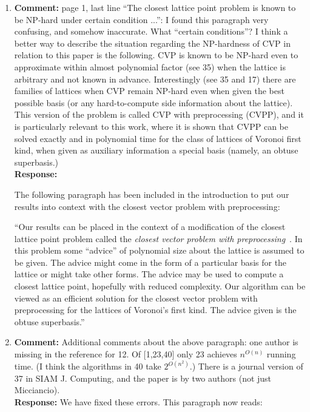 \documentclass[a4paper,10pt]{article}
\begin{document}
\begin{enumerate}
\item\textbf{Comment:}  \label{com:cvvp}
page 1, last line ``The closest lattice point problem is known to be NP-hard under certain condition ...'': I found this paragraph very confusing, and somehow inaccurate. What ``certain conditions''? I think a better way to describe the situation regarding the NP-hardness of CVP in relation to this paper is the following. CVP is known to be NP-hard even to approximate within almost polynomial factor (see 35) when the lattice is arbitrary and not known in advance. Interestingly (see 35 and 17) there are families of lattices when CVP remain NP-hard even when given the best possible basis (or any hard-to-compute side information about the lattice). This version of the problem is called CVP with preprocessing (CVPP), and it is particularly relevant to this work, where it is shown that CVPP can be solved exactly and in polynomial time for the class of lattices of Voronoi first kind, when given as auxiliary information a special basis (namely, an obtuse superbasis.) 
\\\textbf{Response:}

The following paragraph has been included in the introduction to put our results into context with the closest vector problem with preprocessing:

``Our results can be placed in the context of a modification of the closest lattice point problem called the \emph{closest vector problem with preprocessing}~\cite{micciancio_hardness_2001,feige_inapproximability_2004,Regev_2004_inappox_lattice_with_preprocessing,Aleknovish_hardness_with_preprocessing_2011,knot_hardness_cvvp_2014,Dadush_cvp_with_distance_guarantee_2014}.  In this problem some ``advice'' of polynomial size about the lattice is assumed to be given.  The advice might come in the form of a particular basis for the lattice or might take other forms.  The advice may be used to compute a closest lattice point, hopefully with reduced complexity.  %
Our algorithm can be viewed as an efficient solution for the closest vector problem with preprocessing for the lattices of Voronoi's first kind.  The advice given is the obtuse superbasis.''

\item\textbf{Comment:}  
Additional comments about the above paragraph: one author is missing in the reference for 12. Of [1,23,40] only 23 achieves $n^{O(n)}$ running time. (I think the algorithms in 40 take $2^{O(n^2)}$.) There is a journal version of 37 in SIAM J. Computing, and the paper is by two authors (not just Micciancio). 
\\\textbf{Response:}
We have fixed these errors.  This paragraph now reads:


\end{enumerate}
\end{document}
